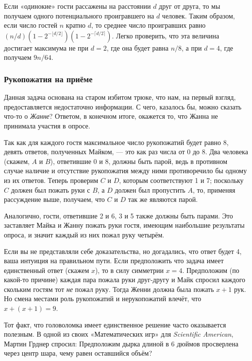 Если «одинокие» гости рассажены на расстоянии $d$ друг от друга, то мы получаем одного потенциального проигравшего на $d$ человек.
Таким образом, если число гостей $n$ кратно $d$, то среднее число проигравших равно $(n/d)(1-2^{-\lfloor d/2\rfloor})(1-2^{-\lceil d/2\rceil})$.
Легко проверить, что эта величина достигает максимума не при $d=2$, где она будет равна $n/8$, а при $d=4$, где получаем $9n/64$.\heart

\subsubsection*{Рукопожатия на приёме}%

Данная задача основана на старом избитом трюке, что нам, на первый взгляд, предоставляется недостаточно информации.  %
С чего, казалось бы, можно сказать что-то о \emph{Жанне}?
Ответом, в конечном итоге, окажется то, что Жанна не принимала участия в опросе.

Так как для каждого гостя максимальное число рукопожатий будет равно 8, 
девять ответов, полученных Майком, --- это как раз числа от 0 до 8.
Два человека (скажем, $A$ и $B$), ответившие 0 и 8, должны быть парой, ведь в противном случае наличие и отсутствие рукопожатия между ними противоречило бы одному из их ответов.
Теперь проверим $C$ и $D$, которым соответствуют 1 и 7;
поскольку $C$ должен был пожать руки с $B$, а $D$ должен был пропустить $A$, то, применяя рассуждение выше, получаем, что $C$ и $D$ так же являются парой.

Аналогично, гости, ответившие 2 и 6, 3 и 5 также должны быть парами.
Это заставляет Майка и Жанну пожать руки гостя, имеющим наибольшие результаты опроса, и значит каждый из них пожал руку четырём.
\heart

Если вы не представляли себе доказательства, но догадались, что ответ будет 4, ваша интуиция на правильном пути.
Если предположить что задача имеет единственный ответ (скажем $x$), то в силу симметрии $x=4$.
Предположим (по какой-то причине) каждая пара пожала руки друг-другу и Майк спросил каждого скольким гостям тот \emph{не} пожал руку.
Тогда Женни должна была пожать $x+1$ рук.
Но смена местами роль рукопожатий и нерукопожатий влечёт, что $x+(x+1)=9$.

Тот факт, что головоломка имеет единственное решение часто оказывается полезным.
В одной из своих «Математических игр» для \emph{Scientific American}, Мартин Грднер спросил:
Предположим дырка длиной в 6 дюймов просверлена через центр шара, чему равен оставшийся объём?

